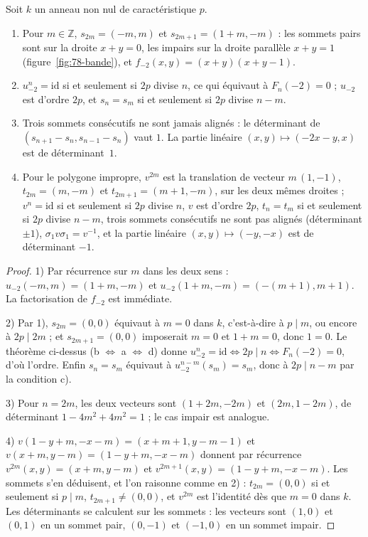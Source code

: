 \begin{enonce}
Soit $k$ un anneau non nul de caractéristique $p$.
\begin{enumerate}
\item Pour $m \in \mathbb Z$, $s_{2m} = (-m, m)$ et $s_{2m+1} = (1 + m, -m)$ : les sommets pairs sont sur la droite $x + y = 0$, les impairs sur la droite parallèle $x + y = 1$ (figure~\ref{fig:78-bande}), et $f_{-2}(x, y) = (x + y)(x + y - 1)$.
\item $u_{-2}^n = \mathrm{id}$ si et seulement si $2p$ divise $n$, ce qui équivaut à $F_n(-2) = 0$ ; $u_{-2}$ est d'ordre $2p$, et $s_n = s_m$ si et seulement si $2p$ divise $n - m$.
\item Trois sommets consécutifs ne sont jamais alignés : le déterminant de $(s_{n+1} - s_n, s_{n-1} - s_n)$ vaut $1$. La partie linéaire $(x, y) \mapsto (-2x - y, x)$ est de déterminant~$1$.
\item Pour le polygone impropre, $v^{2m}$ est la translation de vecteur $m\,(1, -1)$, $t_{2m} = (m, -m)$ et $t_{2m+1} = (m + 1, -m)$, sur les deux mêmes droites ; $v^n = \mathrm{id}$ si et seulement si $2p$ divise $n$, $v$ est d'ordre $2p$, $t_n = t_m$ si et seulement si $2p$ divise $n - m$, trois sommets consécutifs ne sont pas alignés (déterminant $\pm 1$), $\sigma_1 v \sigma_1 = v^{-1}$, et la partie linéaire $(x, y) \mapsto (-y, -x)$ est de déterminant $-1$.
\end{enumerate}
\end{enonce}

\begin{proof}
1) Par récurrence sur $m$ dans les deux sens : $u_{-2}(-m, m) = (1 + m, -m)$ et $u_{-2}(1 + m, -m) = (-(m + 1), m + 1)$. La factorisation de $f_{-2}$ est immédiate.

2) Par 1), $s_{2m} = (0, 0)$ équivaut à $m = 0$ dans $k$, c'est-à-dire à $p \mid m$, ou encore à $2p \mid 2m$ ; et $s_{2m+1} = (0, 0)$ imposerait $m = 0$ et $1 + m = 0$, donc $1 = 0$. Le théorème ci-dessus (b $\Leftrightarrow$ a $\Leftrightarrow$ d) donne $u_{-2}^n = \mathrm{id} \iff 2p \mid n \iff F_n(-2) = 0$, d'où l'ordre. Enfin $s_n = s_m$ équivaut à $u_{-2}^{n-m}(s_m) = s_m$, donc à $2p \mid n - m$ par la condition c).

3) Pour $n = 2m$, les deux vecteurs sont $(1 + 2m, -2m)$ et $(2m, 1 - 2m)$, de déterminant $1 - 4m^2 + 4m^2 = 1$ ; le cas impair est analogue.

4) $v(1 - y + m, -x - m) = (x + m + 1, y - m - 1)$ et $v(x + m, y - m) = (1 - y + m, -x - m)$ donnent par récurrence $v^{2m}(x, y) = (x + m, y - m)$ et $v^{2m+1}(x, y) = (1 - y + m, -x - m)$. Les sommets s'en déduisent, et l'on raisonne comme en 2) : $t_{2m} = (0, 0)$ si et seulement si $p \mid m$, $t_{2m+1} \neq (0, 0)$, et $v^{2m}$ est l'identité dès que $m = 0$ dans $k$. Les déterminants se calculent sur les sommets : les vecteurs sont $(1, 0)$ et $(0, 1)$ en un sommet pair, $(0, -1)$ et $(-1, 0)$ en un sommet impair.
\end{proof}

